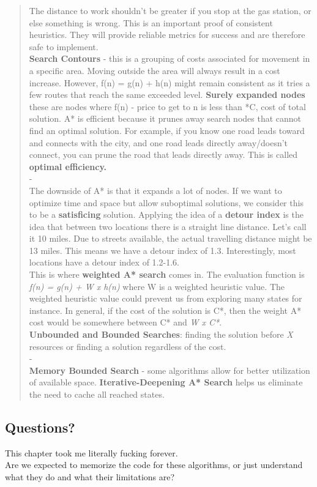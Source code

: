 \documentclass{article}
\begin{document}
\begin{quote}
    The distance to work shouldn't be greater if you stop at the gas station, or else something is wrong. This is an important proof of consistent heuristics. They
    will provide reliable metrics for success and are therefore safe to implement.
    \\ \textbf{Search Contours} - this is a grouping of costs associated for movement in a specific area. Moving outside the area will always result in a cost increase.
    However, f(n) = g(n) + h(n) might remain consistent as it tries a few routes that reach the same exceeded level. \textbf{Surely expanded nodes} these are nodes where f(n) - price to get to n
    is less than *C, cost of total solution. A* is efficient because it prunes away search nodes that cannot find an optimal solution. For example, if you know one road leads toward and connects with the city,
    and one road leads directly away/doesn't connect, you can prune the road that leads directly away. This is called \textbf{optimal efficiency.}
    \\ -
    \\ The downside of A* is that it expands a lot of nodes. If we want to optimize time and space but allow suboptimal solutions, we consider this to be a \textbf{satisficing} solution.
    Applying the idea of a \textbf{detour index} is the idea that between two locations there is a straight line distance. Let's call it 10 miles. Due to streets available, the actual
    travelling distance might be 13 miles. This means we have a detour index of 1.3. Interestingly, most locations have a detour index of 1.2-1.6.
    \\This is where \textbf{weighted A* search} comes in. The evaluation function is \textit{f(n) = g(n) + W x h(n)} where W is a weighted heuristic value. The weighted heuristic value
    could prevent us from exploring many states for instance. In general, if the cost of the solution is C*, then the weight A* cost would be somewhere between C* and \textit{W x C*}.
    \\ \textbf{Unbounded and Bounded Searches}: finding the solution before \textit{X} resources or finding a solution regardless of the cost.
    \\ -
    \\ \textbf{Memory Bounded Search} - some algorithms allow for better utilization of available space. \textbf{Iterative-Deepening A* Search} helps us eliminate the need to cache all reached states.

\end{quote}
\subsection{Questions?}
This chapter took me literally fucking forever.
\\ Are we expected to memorize the code for these algorithms, or just understand what they do and what their limitations are?
\end{document}
